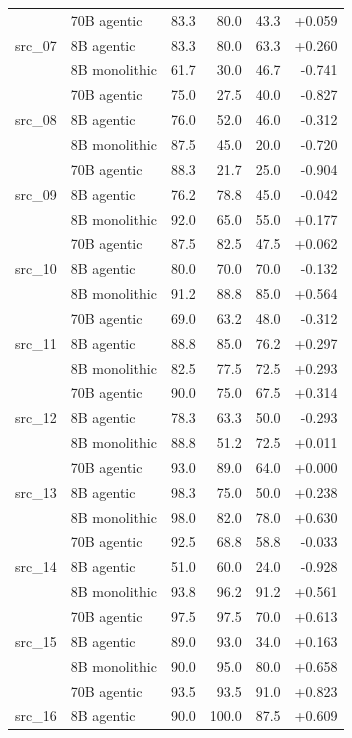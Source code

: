 \begin{longtable}{llrrrr}
 & 70B agentic & 83.3 & 80.0 & 43.3 & +0.059 \\
src\_07 & 8B agentic & 83.3 & 80.0 & 63.3 & +0.260 \\
 & 8B monolithic & 61.7 & 30.0 & 46.7 & -0.741 \\
 & 70B agentic & 75.0 & 27.5 & 40.0 & -0.827 \\
src\_08 & 8B agentic & 76.0 & 52.0 & 46.0 & -0.312 \\
 & 8B monolithic & 87.5 & 45.0 & 20.0 & -0.720 \\
 & 70B agentic & 88.3 & 21.7 & 25.0 & -0.904 \\
src\_09 & 8B agentic & 76.2 & 78.8 & 45.0 & -0.042 \\
 & 8B monolithic & 92.0 & 65.0 & 55.0 & +0.177 \\
 & 70B agentic & 87.5 & 82.5 & 47.5 & +0.062 \\
src\_10 & 8B agentic & 80.0 & 70.0 & 70.0 & -0.132 \\
 & 8B monolithic & 91.2 & 88.8 & 85.0 & +0.564 \\
 & 70B agentic & 69.0 & 63.2 & 48.0 & -0.312 \\
src\_11 & 8B agentic & 88.8 & 85.0 & 76.2 & +0.297 \\
 & 8B monolithic & 82.5 & 77.5 & 72.5 & +0.293 \\
 & 70B agentic & 90.0 & 75.0 & 67.5 & +0.314 \\
src\_12 & 8B agentic & 78.3 & 63.3 & 50.0 & -0.293 \\
 & 8B monolithic & 88.8 & 51.2 & 72.5 & +0.011 \\
 & 70B agentic & 93.0 & 89.0 & 64.0 & +0.000 \\
src\_13 & 8B agentic & 98.3 & 75.0 & 50.0 & +0.238 \\
 & 8B monolithic & 98.0 & 82.0 & 78.0 & +0.630 \\
 & 70B agentic & 92.5 & 68.8 & 58.8 & -0.033 \\
src\_14 & 8B agentic & 51.0 & 60.0 & 24.0 & -0.928 \\
 & 8B monolithic & 93.8 & 96.2 & 91.2 & +0.561 \\
 & 70B agentic & 97.5 & 97.5 & 70.0 & +0.613 \\
src\_15 & 8B agentic & 89.0 & 93.0 & 34.0 & +0.163 \\
 & 8B monolithic & 90.0 & 95.0 & 80.0 & +0.658 \\
 & 70B agentic & 93.5 & 93.5 & 91.0 & +0.823 \\
src\_16 & 8B agentic & 90.0 & 100.0 & 87.5 & +0.609 \\

\end{longtable}
